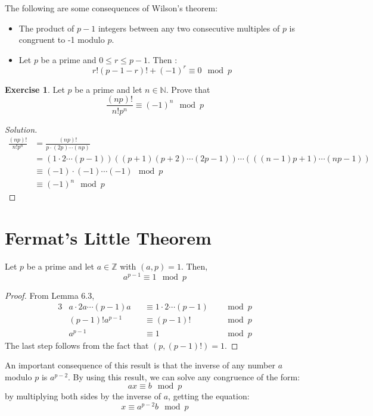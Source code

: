 \documentclass[12pt,letterpaper]{book}
\theoremstyle{definition}
\newtheorem*{exercise}{Exercise}
\newenvironment{solution}
  {\renewcommand\qedsymbol{$\blacksquare$}\begin{proof}[Solution]}
  {\end{proof}}
\newcommand{\N}{\mathbb{N}}
\newcommand{\Z}{\mathbb{Z}}
\begin{document}
The following are some consequences of Wilson's theorem:
\begin{itemize}
  \item The product of $p-1$ integers between any two consecutive multiples of $p$ is congruent to -1 modulo $p$.
  \item Let $p$ be a prime and $0 \leq r \leq p-1$. Then :
    \[r! (p-1-r)! + (-1)^r \equiv 0 \mod p\]
\end{itemize}

\begin{exercise}
  Let $p$ be a prime and let $n \in \N$. Prove that
  \[\frac{(np)!}{n!p^n} \equiv (-1)^n \mod p\]
\end{exercise}
\begin{solution}
  \begin{align*}
    \frac{(np)!}{n!p^n} &= \frac{(np)!}{p \cdot (2p) \cdots (np)} \\
                        &= (1 \cdot 2 \cdots (p-1)) ((p+1)(p+2) \cdots (2p-1)) \cdots (((n-1)p+1) \cdots (np-1)) \\
                        &\equiv (-1) \cdot (-1) \cdots (-1) \mod p \\
                        &\equiv (-1)^n \mod p
  \end{align*}
\end{solution}

\section{Fermat's Little Theorem}

\phantom{}

\begin{theorem}
  Let $p$ be a prime and let $a \in \Z$ with $(a,p) = 1$. Then,
  \[a^{p-1} \equiv 1 \mod p\]
\end{theorem}
\begin{proof}
  From Lemma 6.3,
\begin{alignat*}{3}
  & a \cdot 2a \cdots (p-1)a && \equiv 1 \cdot 2 \cdots (p-1) && \mod p \\
  &(p-1)! a^{p-1} && \equiv (p-1)! &&\mod p \\
  & a^{p-1} && \equiv 1 &&\mod p
\end{alignat*}
The last step follows from the fact that $(p,(p-1)!) = 1$.
\end{proof}

An important consequence of this result is that the inverse of any number $a$ modulo $p$ is $a^{p-2}$. By using this result, we can solve any congruence of the form:
\[ax \equiv b \mod p\]
by multiplying both sides by the inverse of $a$, getting the equation:
\[x \equiv a^{p-2} b \mod p\]
\end{document}
